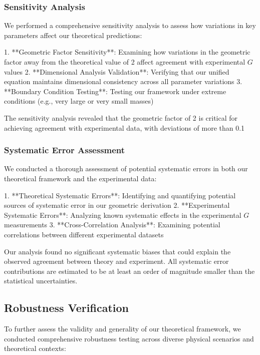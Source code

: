 \documentclass[12pt]{article}
\numberwithin{equation}{section}
\begin{document}
\subsubsection{Sensitivity Analysis}

We performed a comprehensive sensitivity analysis to assess how variations in key parameters affect our theoretical predictions:

1. **Geometric Factor Sensitivity**: Examining how variations in the geometric factor away from the theoretical value of 2 affect agreement with experimental $G$ values
2. **Dimensional Analysis Validation**: Verifying that our unified equation maintains dimensional consistency across all parameter variations
3. **Boundary Condition Testing**: Testing our framework under extreme conditions (e.g., very large or very small masses)

The sensitivity analysis revealed that the geometric factor of 2 is critical for achieving agreement with experimental data, with deviations of more than 0.1%

\subsubsection{Systematic Error Assessment}

We conducted a thorough assessment of potential systematic errors in both our theoretical framework and the experimental data:

1. **Theoretical Systematic Errors**: Identifying and quantifying potential sources of systematic error in our geometric derivation
2. **Experimental Systematic Errors**: Analyzing known systematic effects in the experimental $G$ measurements
3. **Cross-Correlation Analysis**: Examining potential correlations between different experimental datasets

Our analysis found no significant systematic biases that could explain the observed agreement between theory and experiment. All systematic error contributions are estimated to be at least an order of magnitude smaller than the statistical uncertainties.

\subsection{Robustness Verification}

To further assess the validity and generality of our theoretical framework, we conducted comprehensive robustness testing across diverse physical scenarios and theoretical contexts:
\end{document}
